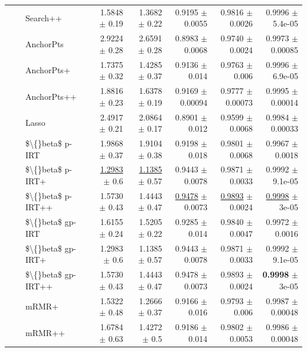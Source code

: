 \begin{longtable}{llp{}rrrrr}
 &  & Search++ & 1.5848 {\scriptsize $\pm$ 0.19} & 1.3682 {\scriptsize $\pm$ 0.22} & 0.9195 {\scriptsize $\pm$ 0.0055} & 0.9816 {\scriptsize $\pm$ 0.0026} & 0.9996 {\scriptsize $\pm$ 5.4e-05} \\
 &  & AnchorPts & 2.9224 {\scriptsize $\pm$ 0.28} & 2.6591 {\scriptsize $\pm$ 0.28} & 0.8983 {\scriptsize $\pm$ 0.0068} & 0.9740 {\scriptsize $\pm$ 0.0024} & 0.9973 {\scriptsize $\pm$ 0.00085} \\
 &  & AnchorPts+ & 1.7375 {\scriptsize $\pm$ 0.32} & 1.4285 {\scriptsize $\pm$ 0.37} & 0.9136 {\scriptsize $\pm$ 0.014} & 0.9763 {\scriptsize $\pm$ 0.006} & 0.9996 {\scriptsize $\pm$ 6.9e-05} \\
 &  & AnchorPts++ & 1.8816 {\scriptsize $\pm$ 0.23} & 1.6378 {\scriptsize $\pm$ 0.19} & 0.9169 {\scriptsize $\pm$ 0.00094} & 0.9777 {\scriptsize $\pm$ 0.00073} & 0.9995 {\scriptsize $\pm$ 0.00014} \\
 &  & Lasso & 2.4917 {\scriptsize $\pm$ 0.21} & 2.0864 {\scriptsize $\pm$ 0.17} & 0.8901 {\scriptsize $\pm$ 0.012} & 0.9599 {\scriptsize $\pm$ 0.0068} & 0.9984 {\scriptsize $\pm$ 0.00033} \\
 &  & \$\textbackslash\{\}beta\$ p-IRT & 1.9868 {\scriptsize $\pm$ 0.37} & 1.9104 {\scriptsize $\pm$ 0.38} & 0.9198 {\scriptsize $\pm$ 0.018} & 0.9801 {\scriptsize $\pm$ 0.0068} & 0.9967 {\scriptsize $\pm$ 0.0018} \\
 &  & \$\textbackslash\{\}beta\$ p-IRT+ & \underline{1.2983} {\scriptsize $\pm$ 0.6} & \underline{1.1385} {\scriptsize $\pm$ 0.57} & 0.9443 {\scriptsize $\pm$ 0.0078} & 0.9871 {\scriptsize $\pm$ 0.0033} & 0.9992 {\scriptsize $\pm$ 9.1e-05} \\
 &  & \$\textbackslash\{\}beta\$ p-IRT++ & 1.5730 {\scriptsize $\pm$ 0.43} & 1.4443 {\scriptsize $\pm$ 0.47} & \underline{0.9478} {\scriptsize $\pm$ 0.0073} & \underline{0.9893} {\scriptsize $\pm$ 0.0024} & \underline{0.9998} {\scriptsize $\pm$ 3e-05} \\
 &  & \$\textbackslash\{\}beta\$ gp-IRT & 1.6155 {\scriptsize $\pm$ 0.24} & 1.5205 {\scriptsize $\pm$ 0.22} & 0.9285 {\scriptsize $\pm$ 0.014} & 0.9840 {\scriptsize $\pm$ 0.0047} & 0.9972 {\scriptsize $\pm$ 0.0016} \\
 &  & \$\textbackslash\{\}beta\$ gp-IRT+ & 1.2983 {\scriptsize $\pm$ 0.6} & 1.1385 {\scriptsize $\pm$ 0.57} & 0.9443 {\scriptsize $\pm$ 0.0078} & 0.9871 {\scriptsize $\pm$ 0.0033} & 0.9992 {\scriptsize $\pm$ 9.1e-05} \\
 &  & \$\textbackslash\{\}beta\$ gp-IRT++ & 1.5730 {\scriptsize $\pm$ 0.43} & 1.4443 {\scriptsize $\pm$ 0.47} & 0.9478 {\scriptsize $\pm$ 0.0073} & 0.9893 {\scriptsize $\pm$ 0.0024} & \textbf{0.9998} {\scriptsize $\pm$ 3e-05} \\
 &  & mRMR+ & 1.5322 {\scriptsize $\pm$ 0.48} & 1.2666 {\scriptsize $\pm$ 0.37} & 0.9166 {\scriptsize $\pm$ 0.016} & 0.9793 {\scriptsize $\pm$ 0.006} & 0.9987 {\scriptsize $\pm$ 0.00048} \\
 &  & mRMR++ & 1.6784 {\scriptsize $\pm$ 0.63} & 1.4272 {\scriptsize $\pm$ 0.5} & 0.9186 {\scriptsize $\pm$ 0.014} & 0.9802 {\scriptsize $\pm$ 0.0053} & 0.9986 {\scriptsize $\pm$ 0.00048} \\
\end{longtable}